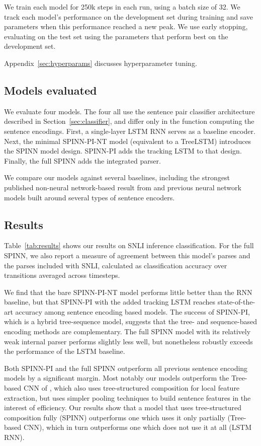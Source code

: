 \documentclass[11pt]{article}
\begin{document}
We train each model for 250k steps in each run, using a batch size of 32. We track each model's performance on the development set during training and save parameters when this performance reached a new peak. We use early stopping, evaluating on the test set using the parameters that perform best on the development set.

Appendix~\ref{sec:hyperparams} discusses hyperparameter tuning.


\subsection{Models evaluated}

We evaluate four models. The four all use the sentence pair classifier architecture described in Section~\ref{sec:classifier}, and differ only in the function computing the sentence encodings. First, a single-layer LSTM RNN \citep[similar to that of][]{snli:emnlp2015} serves as a baseline encoder. Next, the minimal SPINN-PI-NT model (equivalent to a TreeLSTM) introduces the SPINN model design. SPINN-PI adds the tracking LSTM to that design. Finally, the full SPINN adds the integrated parser.

We compare our models against several baselines, including the strongest published non-neural network-based result from \citet{snli:emnlp2015} and previous neural network models built around several types of sentence encoders.

\subsection{Results}

Table~\ref{tab:results} shows our results on SNLI inference classification. For the full SPINN, we also report a measure of agreement between this model's parses and the parses included with SNLI, calculated as classification accuracy over transitions averaged across timesteps.

We find that the bare SPINN-PI-NT model performs little better than the RNN baseline, but that SPINN-PI with the added tracking LSTM reaches state-of-the-art accuracy among sentence encoding based models. The success of SPINN-PI, which is a hybrid tree-sequence model, suggests that the tree- and sequence-based encoding methods are complementary. The full SPINN model with its relatively weak internal parser performs slightly less well, but nonetheless robustly exceeds the performance of the LSTM baseline.

Both SPINN-PI and the full SPINN outperform all previous sentence encoding models by a significant margin. Most notably our models outperform the Tree-based CNN of \citet{mou2015recognizing}, which also uses tree-structured composition for local feature extraction, but uses simpler pooling techniques to build sentence features in the interest of efficiency. Our results show that a model that uses tree-structured composition fully (SPINN) outperforms one which uses it only partially (Tree-based CNN), which in turn outperforms one which does not use it at all (LSTM RNN).
\end{document}

